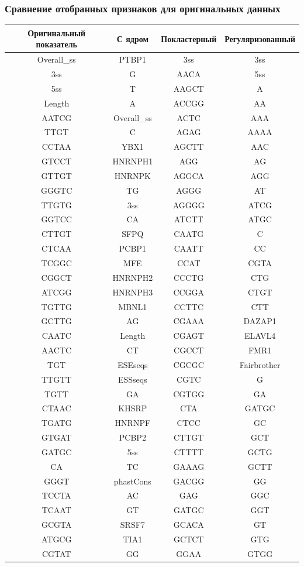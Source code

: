 \subsubsection{Сравнение отобранных признаков для оригинальных данных}

\begin{longtable}{|c|c|c|c|}
	\hline
	Оригинальный показатель & С ядром & Покластерный & Регуляризованный \\ \hline
Overall\_ss & PTBP1 & 3ss & 3ss \\ \hline
3ss & G & AACA & 5ss \\ \hline
5ss & T & AAGCT & A \\ \hline
Length & A & ACCGG & AA \\ \hline
AATCG & Overall\_ss & ACTC & AAA \\ \hline
TTGT & C & AGAG & AAAA \\ \hline
CCTAA & YBX1 & AGCTT & AAC \\ \hline
GTCCT & HNRNPH1 & AGG & AG \\ \hline
GTTGT & HNRNPK & AGGCA & AGG \\ \hline
GGGTC & TG & AGGG & AT \\ \hline
TTGTG & 3ss & AGGGG & ATCG \\ \hline
GGTCC & CA & ATCTT & ATGC \\ \hline
CTTGT & SFPQ & CAATG & C \\ \hline
CTCAA & PCBP1 & CAATT & CC \\ \hline
TCGGC & MFE & CCAT & CGTA \\ \hline
CGGCT & HNRNPH2 & CCCTG & CTG \\ \hline
ATCGG & HNRNPH3 & CCGGA & CTGT \\ \hline
TGTTG & MBNL1 & CCTTC & CTT \\ \hline
GCTTG & AG & CGAAA & DAZAP1 \\ \hline
CAATC & Length & CGAGT & ELAVL4 \\ \hline
AACTC & CT & CGCCT & FMR1 \\ \hline
TGT & ESEseqs & CGCGC & Fairbrother \\ \hline
TTGTT & ESSseqs & CGTC & G \\ \hline
TGTT & GA & CGTGG & GA \\ \hline
CTAAC & KHSRP & CTA & GATGC \\ \hline
TGATG & HNRNPF & CTCC & GC \\ \hline
GTGAT & PCBP2 & CTTGT & GCT \\ \hline
GATGC & 5ss & CTTTT & GCTG \\ \hline
CA & TC & GAAAG & GCTT \\ \hline
GGGT & phastCons & GACGG & GG \\ \hline
TCCTA & AC & GAG & GGC \\ \hline
TCAAT & GT & GATGC & GGT \\ \hline
GCGTA & SRSF7 & GCACA & GT \\ \hline
ATGCG & TIA1 & GCTCT & GTG \\ \hline
CGTAT & GG & GGAA & GTGG \\ \hline


\end{longtable}
